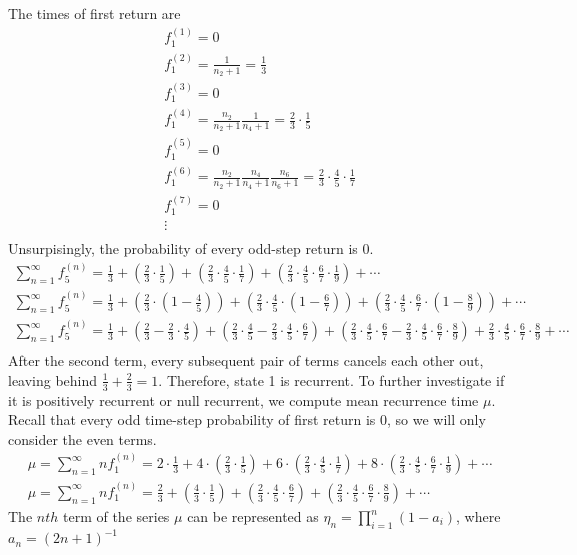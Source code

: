 The times of first return are
\begin{gather*}
f_1^{(1)} = 0 \\
f_1^{(2)} = \frac{1}{n_2+1} = \frac{1}{3} \\
f_1^{(3)} = 0 \\
f_1^{(4)} = \frac{n_2}{n_2+1}  \frac{1}{n_4+1} = \frac{2}{3}\cdot\frac{1}{5}  \\
f_1^{(5)} = 0\\
f_1^{(6)} = \frac{n_2}{n_2+1}  \frac{n_4}{n_4+1}  \frac{n_6}{n_6+1} = \frac{2}{3}\cdot\frac{4}{5}\cdot\frac{1}{7}  \\
f_1^{(7)} = 0 \\
\vdots\\
\end{gather*}
Unsurpisingly, the probability of every odd-step return is 0.
\begin{gather*}
\sum_{n=1}^{\infty}f_{5}^{(n)} = \frac{1}{3} + (\frac{2}{3}\cdot\frac{1}{5}) + (\frac{2}{3}\cdot\frac{4}{5}\cdot\frac{1}{7}) + (\frac{2}{3}\cdot\frac{4}{5}\cdot\frac{6}{7}\cdot\frac{1}{9}) + \cdots\\
\sum_{n=1}^{\infty}f_{5}^{(n)} = \frac{1}{3} + (\frac{2}{3}\cdot(1-\frac{4}{5})) + (\frac{2}{3}\cdot\frac{4}{5}\cdot(1-\frac{6}{7})) + (\frac{2}{3}\cdot\frac{4}{5}\cdot\frac{6}{7}\cdot(1-\frac{8}{9})) + \cdots\\
\sum_{n=1}^{\infty}f_{5}^{(n)} = \frac{1}{3} + (\frac{2}{3} - \frac{2}{3}\cdot\frac{4}{5}) + (\frac{2}{3}\cdot\frac{4}{5} - \frac{2}{3}\cdot\frac{4}{5}\cdot\frac{6}{7}) + (\frac{2}{3}\cdot\frac{4}{5}\cdot\frac{6}{7} - \frac{2}{3}\cdot\frac{4}{5}\cdot\frac{6}{7}\cdot\frac{8}{9}) + \frac{2}{3}\cdot\frac{4}{5}\cdot\frac{6}{7}\cdot\frac{8}{9} + \cdots\\
\end{gather*}
After the second term, every subsequent pair of terms cancels each other out, leaving behind $\frac{1}{3} + \frac{2}{3} = 1$. Therefore, state 1 is recurrent. To further investigate if it is positively recurrent or null recurrent, we compute mean recurrence time $\mu$. Recall that every odd time-step probability of first return is 0, so we will only consider the even terms.
\begin{gather*}
\mu=\sum_{n=1}^{\infty}nf_{1}^{(n)} =  2\cdot\frac{1}{3} + 4\cdot(\frac{2}{3}\cdot\frac{1}{5}) + 6\cdot(\frac{2}{3}\cdot\frac{4}{5}\cdot\frac{1}{7}) + 8\cdot(\frac{2}{3}\cdot\frac{4}{5}\cdot\frac{6}{7}\cdot\frac{1}{9}) + \cdots\\
\mu=\sum_{n=1}^{\infty}nf_{1}^{(n)} =  \frac{2}{3} + (\frac{4}{3}\cdot\frac{1}{5}) + (\frac{2}{3}\cdot\frac{4}{5}\cdot\frac{6}{7}) + (\frac{2}{3}\cdot\frac{4}{5}\cdot\frac{6}{7}\cdot\frac{8}{9}) + \cdots
\end{gather*}
The $nth$ term of the series $\mu$ can be represented as $\eta_n = \prod_{i=1}^{n}(1-a_i)$, where $a_n = (2n+1)^{-1}$

